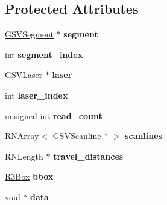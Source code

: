\subsection*{Protected Attributes}
\begin{DoxyCompactItemize}
\item 
\hyperlink{class_g_s_v_segment}{G\+S\+V\+Segment} $\ast$ {\bfseries segment}\hypertarget{class_g_s_v_scan_a4a46bdf4b8b52db74c51c28133b9eb43}{}\label{class_g_s_v_scan_a4a46bdf4b8b52db74c51c28133b9eb43}

\item 
int {\bfseries segment\+\_\+index}\hypertarget{class_g_s_v_scan_a45c80db495212631c2a1ea72e93a999c}{}\label{class_g_s_v_scan_a45c80db495212631c2a1ea72e93a999c}

\item 
\hyperlink{class_g_s_v_laser}{G\+S\+V\+Laser} $\ast$ {\bfseries laser}\hypertarget{class_g_s_v_scan_a52aeadf75c122f58e1ba8d889f691e50}{}\label{class_g_s_v_scan_a52aeadf75c122f58e1ba8d889f691e50}

\item 
int {\bfseries laser\+\_\+index}\hypertarget{class_g_s_v_scan_ad923a848c409d58a7ad3030696df3f8c}{}\label{class_g_s_v_scan_ad923a848c409d58a7ad3030696df3f8c}

\item 
unsigned int {\bfseries read\+\_\+count}\hypertarget{class_g_s_v_scan_a5277bbd894446b960476e18e1a2975a1}{}\label{class_g_s_v_scan_a5277bbd894446b960476e18e1a2975a1}

\item 
\hyperlink{class_r_n_array}{R\+N\+Array}$<$ \hyperlink{class_g_s_v_scanline}{G\+S\+V\+Scanline} $\ast$ $>$ {\bfseries scanlines}\hypertarget{class_g_s_v_scan_a8903425dbed73d2824f813c1175894e5}{}\label{class_g_s_v_scan_a8903425dbed73d2824f813c1175894e5}

\item 
R\+N\+Length $\ast$ {\bfseries travel\+\_\+distances}\hypertarget{class_g_s_v_scan_acd4f8aea966d8f601a857e0d15556fdd}{}\label{class_g_s_v_scan_acd4f8aea966d8f601a857e0d15556fdd}

\item 
\hyperlink{class_r3_box}{R3\+Box} {\bfseries bbox}\hypertarget{class_g_s_v_scan_a0861a947213e569edf542c7089a55257}{}\label{class_g_s_v_scan_a0861a947213e569edf542c7089a55257}

\item 
void $\ast$ {\bfseries data}\hypertarget{class_g_s_v_scan_aba6c332eacf4e7af5981972b144e693f}{}\label{class_g_s_v_scan_aba6c332eacf4e7af5981972b144e693f}

\end{DoxyCompactItemize}
